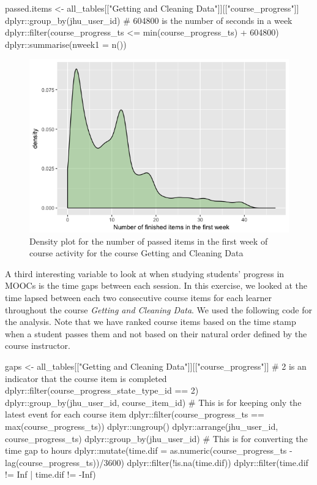 \begin{Schunk}
\begin{Sinput}
passed.items <- all_tables[["Getting and Cleaning Data"]][["course_progress"]] %
    dplyr::group_by(jhu_user_id) %
    # 604800 is the number of seconds in a week
    dplyr::filter(course_progress_ts <= min(course_progress_ts) + 604800) %
    dplyr::summarise(nweek1 = n())
\end{Sinput}
\end{Schunk}

\begin{figure}[htbp]
    \centering
    \includegraphics[scale=0.5]{passeditems}
    \caption{Density plot for the number of passed items in the first week of course activity for the course Getting and Cleaning Data}
    \label{figure:passeditems}
\end{figure}

A third interesting variable to look at when studying students' progress
in MOOCs is the time gaps between each session. In this exercise, we
looked at the time lapsed between each two consecutive course items for
each learner throughout the course \emph{Getting and Cleaning Data}. We
used the following code for the analysis. Note that we have ranked
course items based on the time stamp when a student passes them and not
based on their natural order defined by the course instructor.

\begin{Schunk}
\begin{Sinput}
gaps <- all_tables[["Getting and Cleaning Data"]][["course_progress"]] %
    # 2 is an indicator that the course item is completed
    dplyr::filter(course_progress_state_type_id == 2) %
    dplyr::group_by(jhu_user_id, course_item_id) %
    # This is for keeping only the latest event for each course item
    dplyr::filter(course_progress_ts == max(course_progress_ts)) %
    dplyr::ungroup() %
    dplyr::arrange(jhu_user_id, course_progress_ts) %
    dplyr::group_by(jhu_user_id) %
    # This is for converting the time gap to hours
    dplyr::mutate(time.dif = as.numeric(course_progress_ts - 
                                            lag(course_progress_ts))/3600) %
    dplyr::filter(!is.na(time.dif)) %
    dplyr::filter(time.dif != Inf | time.dif != -Inf)
\end{Sinput}
\end{Schunk}

